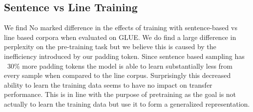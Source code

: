 \subsection{Sentence vs Line Training}
We find No marked difference in the effects of training with sentence-based vs line based corpora when evaluated on GLUE. We do find a large difference in perplexity on the pre-training task but we believe this is caused by the inefficiency introduced by our padding token. Since sentence based sampling has ~30\% more padding tokens the model is able to learn substantially less from every sample when compared to the line corpus. Surprisingly this decreased ability to learn the training data seems to have no impact on transfer performance. This is in line with the purpose of pretraining as the goal is not actually to learn the training data but use it to form a generalized representation. 